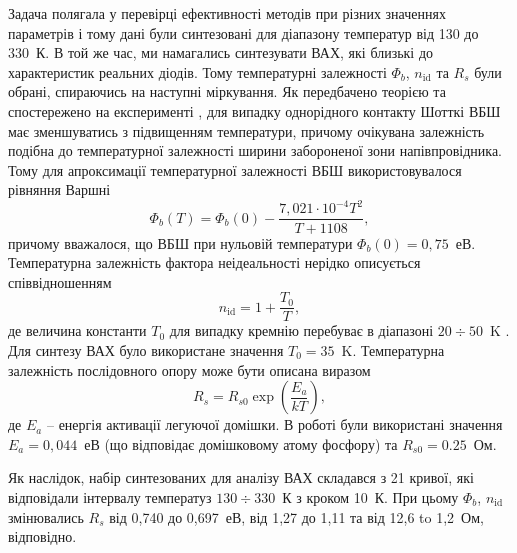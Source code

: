 Задача полягала у перевірці ефективності методів при різних значеннях параметрів і тому дані були синтезовані для діапазону температур від 130 до 330~К.
В той же час, ми намагались синтезувати ВАХ, які близькі до характеристик реальних діодів.
Тому температурні залежності $\Phi_b$, $n_\mathrm{id}$ та $R_s$ були обрані, спираючись на наступні міркування.
Як передбачено теорією \cite{Rhoderick1988} та спостережено на експерименті \cite{Aboelfotoh,Zhua},
для випадку однорідного контакту Шотткі ВБШ має зменшуватись з підвищенням температури, причому очікувана залежність подібна до температурної залежності ширини забороненої зони напівпровідника.
Тому для апроксимації температурної залежності ВБШ використовувалося рівняння Варшні \cite{SiEg2012}
\begin{equation}
\label{eqFbT}
\Phi_b(T) = \Phi_b(0) - \frac{7,021\cdot10^{-4} T^2}{T + 1108} ,
\end{equation}
причому вважалося, що ВБШ при нульовій температури $\Phi_b(0)=0,75$~еВ.
Температурна залежність фактора неідеальності нерідко описується співвідношенням
\begin{equation}
\label{eqnT}
n_\mathrm{id}=1+\frac{T_0}{T},
\end{equation}
де величина константи $T_0$ для випадку кремнію перебуває в діапазоні $20\div50$~K \cite{T0:Lee,T0:McCafferty,T0:Saxena,Aboelfotoh}.
Для синтезу ВАХ було використане значення $T_0=35$~K.
Температурна залежність послідовного опору може бути описана виразом \cite{Sze2012,Rs:Meyaard,Rs:Kang}
\begin{equation}
\label{eqRsT}
R_s=R_{s0}\exp\left(\frac{E_a}{kT}\right),
\end{equation}
де $E_a$ -- енергія активації легуючої домішки.
В роботі були використані значення $E_a=0,044$~еВ (що відповідає домішковому атому фосфору) та $R_{s0}=0.25$~Ом.

Як наслідок, набір синтезованих для аналізу ВАХ складався з 21 кривої, які відповідали інтервалу температуз $130\div330$~К з кроком 10~К.
При цьому  $\Phi_b$, $n_\mathrm{id}$ змінювались $R_s$ від 0,740 до 0,697~еВ, від 1,27 до 1,11 та від 12,6 to 1,2~Ом, відповідно.


